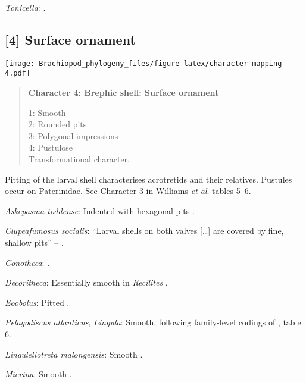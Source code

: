 \documentclass[openany]{book}
\theoremstyle{definition}
\theoremstyle{definition}
\theoremstyle{definition}
\theoremstyle{remark}
\begin{document}
\hypertarget{Tonicella-coding-3}{}
\emph{Tonicella}: \citet{Wanninger2002C}.

\subsection*{{[}4{]} Surface ornament}\label{surface-ornament}

\texttt{[image: Brachiopod\_phylogeny\_files/figure-latex/character-mapping-4.pdf]}

\begin{quote}
\textbf{Character 4: Brephic shell: Surface ornament}

1: Smooth\\
2: Rounded pits\\
3: Polygonal impressions\\
4: Pustulose\\
Transformational character.
\end{quote}

Pitting of the larval shell characterises acrotretids and their
relatives. Pustules occur on Paterinidae. See Character 3 in Williams
\emph{et al}. \citeyearpar{Williams2000LinguliformeaCraniiformea} tables
5--6.

\hypertarget{Askepasma_toddense-coding-4}{}
\emph{Askepasma toddense}: Indented with hexagonal pits \citep[appendix
2]{Williams1998Thediversity}.

\hypertarget{Clupeafumosus_socialis-coding-4}{}
\emph{Clupeafumosus socialis}: ``Larval shells on both valves
{[}\ldots{}{]} are covered by fine, shallow pits'' --
\citet{Topper2013Reappraisalof}.

\hypertarget{Conotheca-coding-4}{}
\emph{Conotheca}: \citep{Wrona2003}.

\hypertarget{Decoritheca-coding-4}{}
\emph{Decoritheca}: Essentially smooth in \emph{Recilites}
\citep{Dzik1978}.

\hypertarget{Eoobolus-coding-4}{}
\emph{Eoobolus}: Pitted \citep[table
8]{Williams2000LinguliformeaCraniiformea}.

\hypertarget{Lingula-coding-4}{}
\emph{Pelagodiscus atlanticus}, \emph{Lingula}: Smooth, following
family-level codings of \citet{Williams2000LinguliformeaCraniiformea},
table 6.

\hypertarget{Lingulellotreta_malongensis-coding-4}{}
\emph{Lingulellotreta malongensis}: Smooth
\citep{Holmer1997EarlyCambrian, Li2004}.

\hypertarget{Micrina-coding-4}{}
\emph{Micrina}: Smooth \citep{Holmer2011Firstrecord}.
\end{document}
